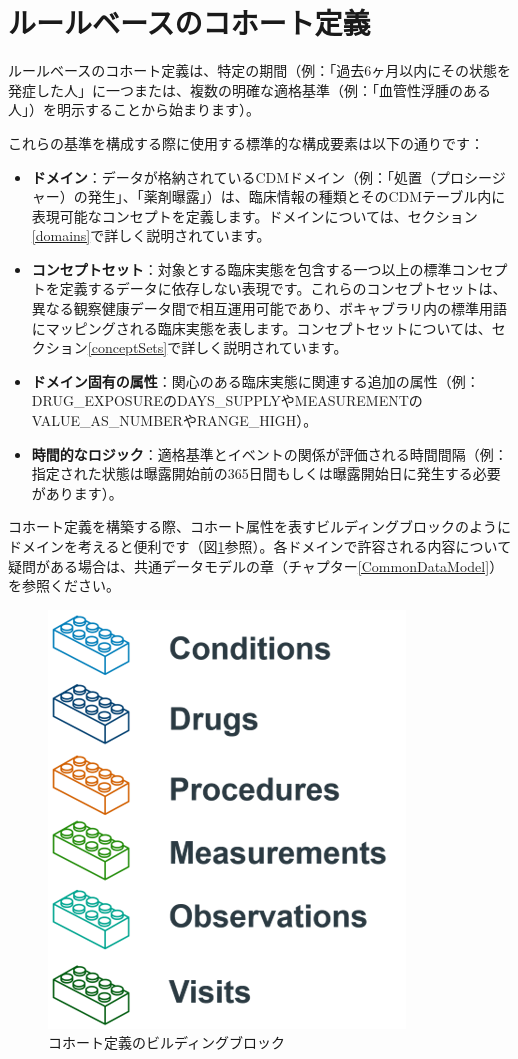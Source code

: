 \documentclass[
  11pt]{book}
\theoremstyle{definition}
\theoremstyle{definition}
\theoremstyle{definition}
\theoremstyle{definition}
\theoremstyle{remark}
\begin{document}
\section{ルールベースのコホート定義}\label{ux30ebux30fcux30ebux30d9ux30fcux30b9ux306eux30b3ux30dbux30fcux30c8ux5b9aux7fa9}

ルールベースのコホート定義は、特定の期間（例：「過去6ヶ月以内にその状態を発症した人」に一つまたは、複数の明確な適格基準（例：「血管性浮腫のある人」）を明示することから始まります）。

これらの基準を構成する際に使用する標準的な構成要素は以下の通りです：

\begin{itemize}
\item
  \textbf{ドメイン}：データが格納されているCDMドメイン（例：「処置（プロシージャー）の発生」、「薬剤曝露」）は、臨床情報の種類とそのCDMテーブル内に表現可能なコンセプトを定義します。ドメインについては、セクション\ref{domains}で詳しく説明されています。
\item
  \textbf{コンセプトセット}：対象とする臨床実態を包含する一つ以上の標準コンセプトを定義するデータに依存しない表現です。これらのコンセプトセットは、異なる観察健康データ間で相互運用可能であり、ボキャブラリ内の標準用語にマッピングされる臨床実態を表します。コンセプトセットについては、セクション\ref{conceptSets}で詳しく説明されています。
\item
  \textbf{ドメイン固有の属性}：関心のある臨床実態に関連する追加の属性（例：DRUG\_EXPOSUREのDAYS\_SUPPLYやMEASUREMENTのVALUE\_AS\_NUMBERやRANGE\_HIGH）。
\item
  \textbf{時間的なロジック}：適格基準とイベントの関係が評価される時間間隔（例：指定された状態は曝露開始前の365日間もしくは曝露開始日に発生する必要があります）。
\end{itemize}

コホート定義を構築する際、コホート属性を表すビルディングブロックのようにドメインを考えると便利です（図\ref{fig:cohortLegos}参照）。各ドメインで許容される内容について疑問がある場合は、共通データモデルの章（チャプター\ref{CommonDataModel}）を参照ください。

\begin{figure}

{\centering \includegraphics[width=0.5\linewidth]{images/Cohorts/cohort-legos} 

}

\caption{コホート定義のビルディングブロック}\label{fig:cohortLegos}
\end{figure}
\end{document}
